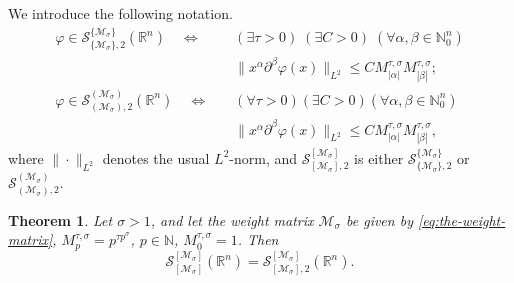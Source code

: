 \documentclass{article}
\theoremstyle{thmstyleone}
\newtheorem{Theorem}{Theorem}[section]%
\theoremstyle{thmstyletwo}%
\theoremstyle{thmstylethree}%
\begin{document}
We introduce the following notation.
\begin{align}
\varphi\in \mathcal  S_{\{\mathcal{M}_\sigma\},2}^{\{\mathcal{M}_\sigma\}} (\mathbb R^n) \quad \Leftrightarrow \quad & (\exists \tau>0)\;(\exists C>0)\;(\forall \alpha,
\beta\in\mathbb N_0^n) \nonumber \\
   &\|x^\alpha \partial^\beta \varphi(x)\|_{L^2}
  \leq C M^{\tau,\sigma}_{|\alpha|}     M^{\tau,\sigma}_{|\beta|};
  \label{eq:L2Roumieu}\\
\varphi\in \mathcal S_{(\mathcal{M}_\sigma),2}^{(\mathcal{M}_\sigma)} (\mathbb R^n) \quad \Leftrightarrow \quad & (\forall \tau>0) (\exists C>0)(\forall \alpha,\beta\in\mathbb N_0^n) 
\nonumber \\
   &\|x^\alpha \partial^\beta \varphi(x)\|_{L^2}\leq C
   M^{\tau,\sigma}_{|\alpha|}    M^{\tau,\sigma}_{|\beta|},
   \label{eq:L2Beurling}
\end{align}
where $\| \cdot \|_{L^2}$ denotes the usual $L^2$-norm,
and $\mathcal S_{[\mathcal{M}_\sigma],2}^{[\mathcal{M}_\sigma]} $ is either
$ \mathcal  S_{\{\mathcal{M}_\sigma\},2}^{\{\mathcal{M}_\sigma\}}$
or $ \mathcal S_{(\mathcal{M}_\sigma),2}^{(\mathcal{M}_\sigma)}$.


\begin{Theorem} \label{thm:L2-and-Linfty}
Let $\sigma>1$, and let the weight matrix $\mathcal{M}_\sigma$ be given by 
\eqref{eq:the-weight-matrix}, 
$ M_{p}^{\tau,\sigma}=p^{\tau p^\sigma}$, $ p\in \mathbb{N}$, $ M_0^{\tau,\sigma}=1$.
Then 
\begin{equation}
\mathcal S_{[\mathcal{M}_\sigma ] }^{ [\mathcal{M}_\sigma]} (\mathbb R^n)
=  \mathcal S_{[\mathcal{M}_\sigma],2}^{[\mathcal{M}_\sigma]} (\mathbb R^n).    \label{eq:L2-and-Linfty}
\end{equation}
\end{Theorem}
\end{document}
